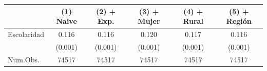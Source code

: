 \begin{table}
\centering
\begin{tabular}[t]{lccccc}
\toprule
  & (1) Naive & (2) + Exp. & (3) + Mujer & (4) + Rural & (5) + Región\\
\midrule
Escolaridad & 0.116 & 0.116 & 0.120 & 0.117 & 0.116\\
 & (0.001) & (0.001) & (0.001) & (0.001) & (0.001)\\
\midrule
Num.Obs. & 74517 & 74517 & 74517 & 74517 & 74517\\
\bottomrule
\end{tabular}
\end{table}
